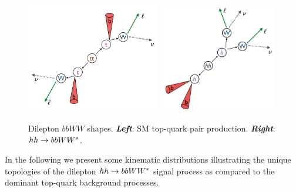 \begin{figure}[!htb]
    \begin{center}
        \includegraphics[width=0.52\textwidth]{figures/search_hh/signal_pheno/ttbar_topo}
        \includegraphics[width=0.46\textwidth]{figures/search_hh/signal_pheno/hh_topo}
        \caption{
            Dilepton $bbWW$ shapes.
            \textit{\textbf{Left}}: SM top-quark pair production.
            \textit{\textbf{Right}}: $hh \rightarrow bbWW^*$.
        }
        \label{fig:hh_topo}
    \end{center}
\end{figure}

%
%

In the following we present some kinematic distributions illustrating the unique topologies
of the dilepton $hh \rightarrow bbWW^*$ signal process as compared to the dominant top-quark background
processes.

